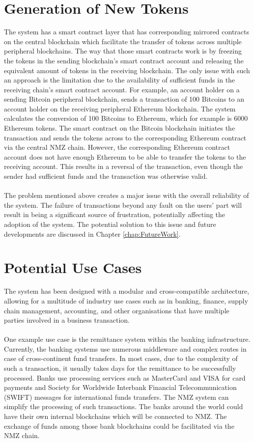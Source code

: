 \documentclass[a4paper,twoside,phd]{BYUPhys}
\begin{document}
\section{Generation of New Tokens}
The system has a smart contract layer that has corresponding mirrored contracts on the central blockchain which facilitate the transfer of tokens across multiple peripheral blockchains. The way that those smart contracts work is by freezing the tokens in the sending blockchain's smart contract account and releasing the equivalent amount of tokens in the receiving blockchain. The only issue with such an approach is the limitation due to the availability of sufficient funds in the receiving chain's smart contract account. For example, an account holder on a sending Bitcoin peripheral blockchain, sends a transaction of 100 Bitcoins to an account holder on the receiving peripheral Ethereum blockchain. The system calculates the conversion of 100 Bitcoins to Ethereum, which for example is 6000 Ethereum tokens. The smart contract on the Bitcoin blockchain initiates the transaction and sends the tokens across to the corresponding Ethereum contract via the central NMZ chain. However, the corresponding Ethereum contract account does not have enough Ethereum to be able to transfer the tokens to the receiving account. This results in a reversal of the transaction, even though the sender had sufficient funds and the transaction was otherwise valid. 
\\
\\
The problem mentioned above creates a major issue with the overall reliability of the system. The failure of transactions beyond any fault on the users' part will result in being a significant source of frustration, potentially affecting the adoption of the system. The potential solution to this issue and future developments are discussed in Chapter \ref{chap:FutureWork}.
\section{Potential Use Cases}
The system has been designed with a modular and cross-compatible architecture, allowing for a multitude of industry use cases such as in banking, finance, supply chain management, accounting, and other organisations that have multiple parties involved in a business transaction. 
\\
\\
One example use case is the remittance system within the banking infrastructure. Currently, the banking systems use numerous middleware and complex routes in case of  cross-continent fund transfers. In most cases, due to the complexity of such a transaction, it usually takes days for the remittance to be successfully processed. Banks use processing services such as MasterCard and VISA for card payments and Society for Worldwide Interbank Financial Telecommunication (SWIFT) messages for international funds transfers\cite{2018SWIFTTransferWise}. The NMZ system can simplify the processing of such transactions. The banks around the world could have their own internal blockchains which will be connected to NMZ. The exchange of funds among those bank blockchains could be facilitated via the NMZ chain. 
\end{document}

